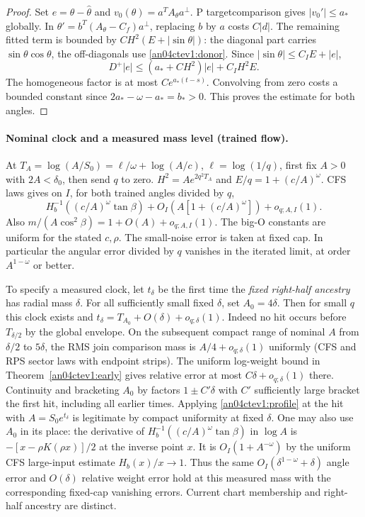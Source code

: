 \documentclass[11pt]{article}
\begin{document}
\begin{proof}
Set $e=\theta-\widehat\theta$ and $v_0(\theta)=a^TA_\theta a^\perp$.
P targetcomparison gives $|v_0'|\le a_*$ globally. In
$\theta'=b^T(A_\theta-C_f)a^\perp$, replacing $b$ by $a$
costs $C|d|$. The remaining fitted term is bounded by
$C H^2(E+|\sin\theta|)$: the diagonal part carries
$\sin\theta\cos\theta$, the off-diagonals use \eqref{an04ctev1:donor}.
Since $|\sin\theta|\le C_I E+|e|$,
\[
 D^+|e|\le(a_*+CH^2)|e|+C_I H^2E .
\]
The homogeneous factor is at most $C e^{a_*(t-s)}$.
Convolving from zero costs a bounded constant since
$2a_*-\omega-a_*=b_*>0$. This proves the estimate for both angles.
\end{proof}

\paragraph{Nominal clock and a measured mass level (trained flow).}
\label{an04ctev1:clock}
At $T_A=\log(A/S_0)=\ell/\omega+\log(A/c)$,
$\ell=\log(1/q)$, first fix $A>0$ with $2A<\delta_0$, then send $q$
to zero. $H^2=Ae^{2q^2T_A}$ and $E/q=1+(c/A)^\omega$.
CFS laws gives on $I$, for both trained angles divided by $q$,
\begin{equation}\label{an04ctev1:profile}
 H_b^{-1}((c/A)^\omega\tan\beta)
       +O_I(A[1+(c/A)^\omega])+o_{q;A,I}(1).
\end{equation}
Also $m/(A\cos^2\beta)=1+O(A)+o_{q;A,I}(1)$.
The big-O constants are uniform for the stated $c,\rho$.
The small-noise error is taken at fixed cap.
In particular the angular error divided by $q$ vanishes in the
iterated limit, at order $A^{1-\omega}$ or better.

To specify a measured clock, let $t_\delta$ be the first time the
\emph{fixed right-half ancestry} has radial mass $\delta$.
For all sufficiently small fixed $\delta$, set $A_0=4\delta$.
Then for small $q$ this clock exists and
$t_\delta=T_{A_0}+O(\delta)+o_{q;\delta}(1)$.
Indeed no hit occurs before $T_{\delta/2}$ by the global envelope.
On the subsequent compact range of nominal $A$ from $\delta/2$ to
$5\delta$, the RMS join comparison mass is $A/4+o_{q;\delta}(1)$
uniformly (CFS and RPS sector laws with endpoint strips).
The uniform log-weight bound in Theorem~\ref{an04ctev1:early} gives
relative error at most $C\delta+o_{q;\delta}(1)$ there.
Continuity and bracketing $A_0$ by factors $1\pm C'\delta$
with $C'$ sufficiently large bracket the first hit, including all
earlier times. Applying \eqref{an04ctev1:profile} at the hit
with $A=S_0e^{t_\delta}$ is legitimate by compact uniformity
at fixed $\delta$. One may also use $A_0$ in its place:
the derivative of $H_b^{-1}((c/A)^\omega\tan\beta)$ in $\log A$
is $-[x-\rho K(\rho x)]/2$ at the inverse point $x$.
It is $O_I(1+A^{-\omega})$ by the uniform CFS large-input estimate
$H_b(x)/x\to1$. Thus the same $O_I(\delta^{1-\omega}+\delta)$
angle error and $O(\delta)$ relative weight error hold at this
measured mass with the corresponding fixed-cap vanishing errors.
Current chart membership and right-half ancestry are distinct.
\end{document}

